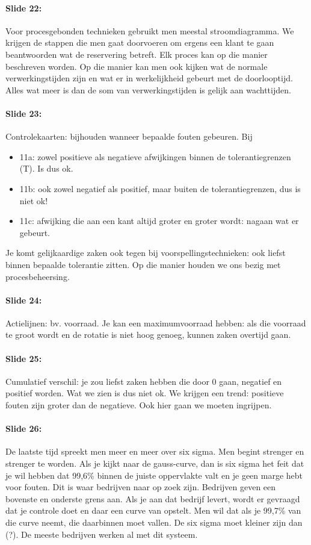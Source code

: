 \documentclass[10pt,a4paper]{report}
\begin{document}
\paragraph{Slide 22:} Voor procesgebonden technieken gebruikt men meestal stroomdiagramma. We krijgen de stappen die men gaat doorvoeren om ergens een klant te gaan beantwoorden wat de reservering betreft. Elk proces kan op die manier beschreven worden. Op die manier kan men ook kijken wat de normale verwerkingstijden zijn en wat er in werkelijkheid gebeurt met de doorlooptijd. Alles wat meer is dan de som van verwerkingstijden is gelijk aan wachttijden.

\paragraph{Slide 23:} Controlekaarten: bijhouden wanneer bepaalde fouten gebeuren. Bij 
\begin{itemize}
\item 11a: zowel positieve als negatieve afwijkingen binnen de tolerantiegrenzen (T). Is dus ok. 
\item 11b: ook zowel negatief als positief, maar buiten de tolerantiegrenzen, dus is niet ok! 
\item 11c: afwijking die aan een kant altijd groter en groter wordt: nagaan wat er gebeurt.
\end{itemize} 
Je komt gelijkaardige zaken ook tegen bij voorspellingstechnieken: ook liefst binnen bepaalde tolerantie zitten. Op die manier houden we ons bezig met procesbeheersing.

\paragraph{Slide 24:} Actielijnen: bv. voorraad. Je kan een maximumvoorraad hebben: als die voorraad te groot wordt en de rotatie is niet hoog genoeg, kunnen zaken overtijd gaan. 

\paragraph{Slide 25:} Cumulatief verschil: je zou liefst zaken hebben die door 0 gaan, negatief en positief worden. Wat we zien is dus niet ok. We krijgen een trend: positieve fouten zijn groter dan de negatieve. Ook hier gaan we moeten ingrijpen.

\paragraph{Slide 26:} De laatste tijd spreekt men meer en meer over  six sigma. Men begint strenger en strenger te worden. Als je kijkt naar de gauss-curve, dan is six sigma het feit dat je wil hebben dat 99,6\% binnen de juiste oppervlakte valt en je geen marge hebt voor fouten. Dit is waar bedrijven naar op zoek zijn. Bedrijven geven een bovenste en onderste grens aan. Als je aan dat bedrijf levert, wordt er gevraagd dat je controle doet en daar een curve van opstelt. Men wil dat als je 99,7\% van die curve neemt, die daarbinnen moet vallen. De six sigma moet kleiner zijn dan (?). %
De meeste bedrijven werken al met dit systeem. 
\end{document}

